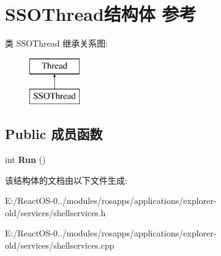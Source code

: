 \hypertarget{struct_s_s_o_thread}{}\section{S\+S\+O\+Thread结构体 参考}
\label{struct_s_s_o_thread}
类 S\+S\+O\+Thread 继承关系图\+:\begin{figure}[H]
\begin{center}
\leavevmode
\includegraphics[height=2.000000cm]{struct_s_s_o_thread}
\end{center}
\end{figure}
\subsection*{Public 成员函数}
\begin{DoxyCompactItemize}
\item 
\mbox{\label{struct_s_s_o_thread_af9fc99926ca6e2867b427e49b02ec7c5}} 
int {\bfseries Run} ()
\end{DoxyCompactItemize}


该结构体的文档由以下文件生成\+:\begin{DoxyCompactItemize}
\item 
E\+:/\+React\+O\+S-\/0../modules/rosapps/applications/explorer-\/old/services/shellservices.\+h\item 
E\+:/\+React\+O\+S-\/0../modules/rosapps/applications/explorer-\/old/services/shellservices.\+cpp\end{DoxyCompactItemize}
